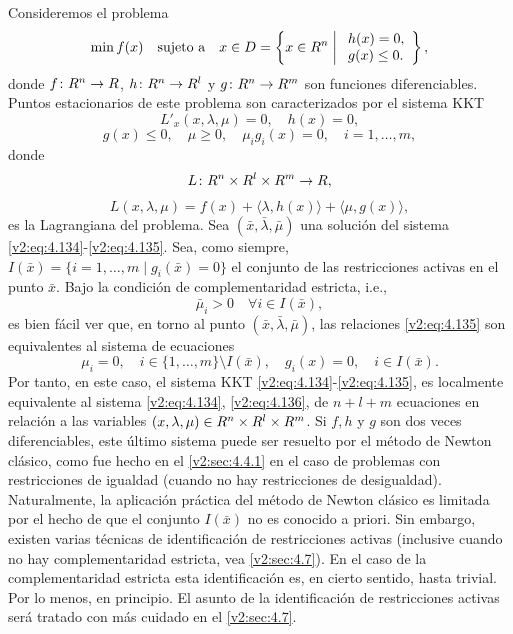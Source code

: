 Consideremos el problema
\begin{equation}
    \min f(x) \quad \text{sujeto a} \quad x \in D = \left\{ x \in R^n \;\middle|\; \begin{array}{l} h(x) = 0, \\ g(x) \le 0. \end{array} \right\},
    \label{v2:eq:4.133}
\end{equation}
donde $f \colon R^n \to R$, $h \colon R^n \to R^l$ y $g \colon R^n \to R^m$ son funciones diferenciables.
Puntos estacionarios de este problema son caracterizados por el sistema KKT
\begin{equation}
    L'_x(x, \lambda, \mu) = 0, \quad h(x) = 0,
    \label{v2:eq:4.134}
\end{equation}
\begin{equation}
    g(x) \le 0, \quad \mu \ge 0, \quad \mu_i g_i(x) = 0, \quad i = 1, \dots, m,
    \label{v2:eq:4.135}
\end{equation}
donde
\[
    L \colon R^n \times R^l \times R^m \to R,
\]
\[
    L(x, \lambda, \mu) = f(x) + \langle \lambda, h(x) \rangle + \langle \mu, g(x) \rangle,
\]
es la Lagrangiana del problema.
Sea $(\bar{x}, \bar{\lambda}, \bar{\mu})$ una solución del sistema \eqref{v2:eq:4.134}-\eqref{v2:eq:4.135}. Sea, como siempre, $I(\bar{x}) = \{i = 1, \dots, m \mid g_i(\bar{x}) = 0\}$ el conjunto de las restricciones activas en el punto $\bar{x}$. Bajo la condición de complementaridad estricta, i.e.,
\[
    \bar{\mu}_i > 0 \quad \forall i \in I(\bar{x}),
\]
es bien fácil ver que, en torno al punto $(\bar{x}, \bar{\lambda}, \bar{\mu})$, las relaciones \eqref{v2:eq:4.135} son equivalentes al sistema de ecuaciones
\begin{equation}
    \mu_i = 0, \quad i \in \{1, \dots, m\} \setminus I(\bar{x}), \quad g_i(x) = 0, \quad i \in I(\bar{x}).
    \label{v2:eq:4.136}
\end{equation}
Por tanto, en este caso, el sistema KKT \eqref{v2:eq:4.134}-\eqref{v2:eq:4.135}, es localmente equivalente al sistema \eqref{v2:eq:4.134}, \eqref{v2:eq:4.136}, de $n + l + m$ ecuaciones en relación a las variables $(x, \lambda, \mu) \in R^n \times R^l \times R^m$. Si $f, h$ y $g$ son dos veces diferenciables, este último sistema puede ser resuelto por el método de Newton clásico, como fue hecho en el \cref{v2:sec:4.4.1} en el caso de problemas con restricciones de igualdad (cuando no hay restricciones de desigualdad). Naturalmente, la aplicación práctica del método de Newton clásico es limitada por el hecho de que el conjunto $I(\bar{x})$ no es conocido a priori. Sin embargo, existen varias técnicas de identificación de restricciones activas (inclusive cuando no hay complementaridad estricta, vea \cref{v2:sec:4.7}). En el caso de la complementaridad estricta esta identificación es, en cierto sentido, hasta trivial. Por lo menos, en principio. El asunto de la identificación de restricciones activas será tratado con más cuidado en el \cref{v2:sec:4.7}.


